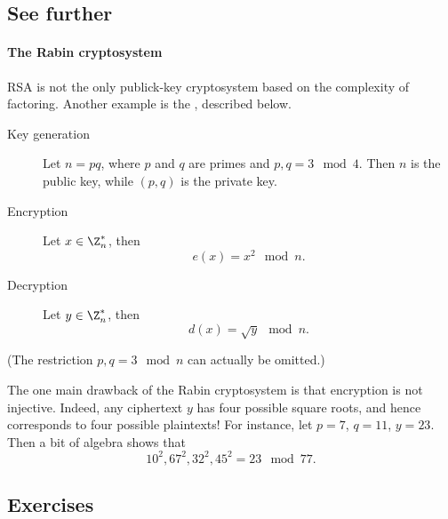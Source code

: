 \documentclass[a4paper, 11pt, openany]{book}
\begin{document}
\subsection{See further}

\paragraph{The Rabin cryptosystem}
RSA is not the only publick-key cryptosystem based on the complexity of factoring. Another example is the , described below.
\begin{description}
    \item[Key generation] Let $n = pq$, where $p$ and $q$ are primes and $p,q = 3 \mod 4$. Then $n$ is the public key, while $(p,q)$ is the private key.

    \item[Encryption] Let $x \in \Z_n^*$, then
    \[
        e(x) = x^2 \mod n.
    \]

    \item[Decryption] Let $y \in \Z_n^*$, then
    \[
        d(x) = \sqrt{y} \mod n.
    \]
\end{description}
(The restriction $p,q = 3 \mod n$ can actually be omitted.)

The one main drawback of the Rabin cryptosystem is that encryption is not injective. Indeed, any ciphertext $y$ has four possible square roots, and hence corresponds to four possible plaintexts! For instance, let $p = 7$, $q = 11$, $y = 23$. Then a bit of algebra shows that
\[
    10^2, 67^2, 32^2, 45^2 = 23 \mod 77.
\]

\subsection{Exercises}
\end{document}
